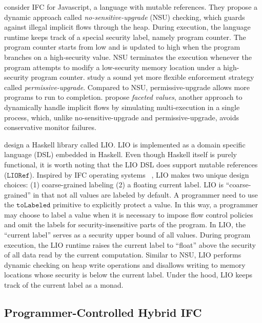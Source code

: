 \documentclass[10pt, letterpaper]{article}
\newcommand{\key}[1]{\ensuremath{\mathtt{#1}}}
\begin{document}
\citet{austin2009efficient} consider IFC for Javascript, a language with
mutable references. They propose a dynamic approach called
\textit{no-sensitive-upgrade} (NSU) checking, which guards against illegal
implicit flows through the heap. During execution, the language runtime keeps
track of a special security label, namely program counter. The program counter
starts from low and is updated to high when the program branches on a
high-security value. NSU terminates the execution whenever the program attempts
to modify a low-security memory location under a high-security program counter.
\citet{austin2010permissive} study a sound yet more flexible enforcement
strategy called \textit{permissive-upgrade}. Compared to NSU, permissive-upgrade
allows more programs to run to completion.
\citet{austin2012multiple,Austin:2017uh} propose \textit{faceted values},
another approach to dynamically handle implicit flows by simulating
multi-execution in a single process, which, unlike no-sensitive-upgrade and
permissive-upgrade, avoids conservative monitor failures.

\citet{stefan2011flexible,stefan2012flexible,STEFAN:2017ta} design a Haskell
library called LIO. LIO is implemented as a domain specific language (DSL)
embedded in Haskell. Even though Haskell itself is purely functional, it is
worth noting that the LIO DSL does support mutable references (\key{LIORef}).
Inspired by IFC operating systems
~\citep{efstathopoulos2005labels,zeldovich2011making,krohn2007information,vandebogart2007labels},
LIO makes two unique design choices: (1) coarse-grained labeling (2) a floating
current label. LIO is ``coarse-grained'' in that not all values are labeled by
default. A programmer need to use the \key{toLabeled} primitive to explicitly
protect a value. In this way, a programmer may choose to label a value when it
is necessary to impose flow control policies and omit the labels for
security-insensitive parts of the program. In LIO, the ``current label'' serves
as a security upper bound of all values. During program execution, the LIO
runtime raises the current label to ``float'' above the security of all data
read by the current computation. Similar to NSU, LIO performs dynamic checking
on heap write operations and disallows writing to memory locations whose
security is below the current label. Under the hood, LIO keeps track of the
current label as a monad.

\subsection{Programmer-Controlled Hybrid IFC}
\label{sec:intro-hybrid}
\end{document}
